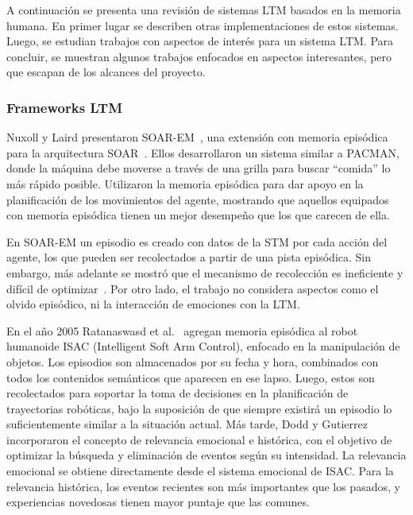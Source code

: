 A continuación se presenta una revisión de sistemas LTM basados en la memoria humana. En primer lugar se describen otras implementaciones de estos sistemas. Luego, se estudian trabajos con aspectos de interés para un sistema LTM. Para concluir, se muestran algunos trabajos enfocados en aspectos interesantes, pero que escapan de los alcances del proyecto.

\subsubsection{Frameworks LTM}

Nuxoll y Laird presentaron SOAR-EM~\cite{Nuxoll2004ACM}, una extensión con memoria episódica para la arquitectura SOAR~\cite{LAIRD19871}. Ellos desarrollaron un sistema similar a PACMAN, donde la máquina debe moverse a través de una grilla para buscar ``comida'' lo más rápido posible. Utilizaron la memoria episódica para dar apoyo en la planificación de los movimientos del agente, mostrando que aquellos equipados con memoria episódica tienen un mejor desempeño que los que carecen de ella. 

En SOAR-EM un episodio es creado con datos de la STM por cada acción del agente, los que pueden ser recolectados a partir de una pista episódica. Sin embargo, más adelante se mostró que el mecanismo de recolección es ineficiente y difícil de optimizar~\cite{Nuxoll2007}. Por otro lado, el trabajo no considera aspectos como el olvido episódico, ni la interacción de emociones con la LTM.


En el año 2005 Ratanaswasd et al.~\cite{Ratanaswasd2005} agregan memoria episódica al robot humanoide ISAC (Intelligent Soft Arm Control), enfocado en la manipulación de objetos. Los episodios son almacenados por su fecha y hora, combinados con todos los contenidos semánticos que aparecen en ese lapso. Luego, estos son recolectados para soportar la toma de decisiones en la planificación de trayectorias robóticas, bajo la suposición de que siempre existirá un episodio lo suficientemente similar a la situación actual. Más tarde, Dodd y Gutierrez~\cite{Dodd2005} incorporaron el concepto de relevancia emocional e histórica, con el objetivo de optimizar la búsqueda y eliminación de eventos según su intensidad. La relevancia emocional se obtiene directamente desde el sistema emocional de ISAC. Para la relevancia histórica, los eventos recientes son más importantes que los pasados, y experiencias novedosas tienen mayor puntaje que las comunes.


